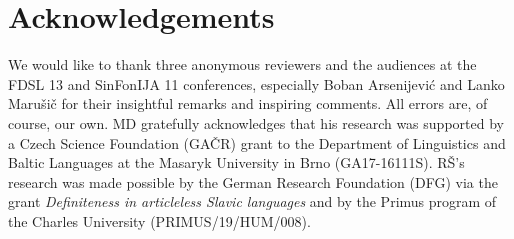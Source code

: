\documentclass[output=paper,colorlinks,citecolor=brown,newtxmath]{langscibook}
\begin{document}
\section*{Acknowledgements}
We would like to thank three anonymous reviewers and the audiences at the FDSL 13 and SinFonIJA 11 conferences, especially Boban Arsenijević and Lanko Marušič for their insightful remarks and inspiring comments. All errors are, of course, our own. MD gratefully acknowledges that his research was supported by a Czech Science Foundation (GAČR) grant to the Department of Linguistics and Baltic Languages at the Masaryk University in Brno (GA17-16111S). RŠ's research was made possible by the German Research Foundation (DFG) via the grant \textit{Definiteness in articleless Slavic languages} and by the Primus program of the Charles University (PRIMUS/19/HUM/008).

\sloppy
\printbibliography[heading=subbibliography,notkeyword=this]
\end{document}
